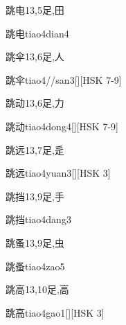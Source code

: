 \begin{Entry}{跳电}{13,5}{⾜,⽥}
  \begin{Phonetics}{跳电}{tiao4dian4}
  \end{Phonetics}
\end{Entry}

\begin{Entry}{跳伞}{13,6}{⾜,⼈}
  \begin{Phonetics}{跳伞}{tiao4//san3}[][HSK 7-9]
  \end{Phonetics}
\end{Entry}

\begin{Entry}{跳动}{13,6}{⾜,⼒}
  \begin{Phonetics}{跳动}{tiao4dong4}[][HSK 7-9]
  \end{Phonetics}
\end{Entry}

\begin{Entry}{跳远}{13,7}{⾜,⾡}
  \begin{Phonetics}{跳远}{tiao4yuan3}[][HSK 3]
  \end{Phonetics}
\end{Entry}

\begin{Entry}{跳挡}{13,9}{⾜,⼿}
  \begin{Phonetics}{跳挡}{tiao4dang3}
  \end{Phonetics}
\end{Entry}

\begin{Entry}{跳蚤}{13,9}{⾜,⾍}
  \begin{Phonetics}{跳蚤}{tiao4zao5}
  \end{Phonetics}
\end{Entry}

\begin{Entry}{跳高}{13,10}{⾜,⾼}
  \begin{Phonetics}{跳高}{tiao4gao1}[][HSK 3]
  \end{Phonetics}
\end{Entry}

